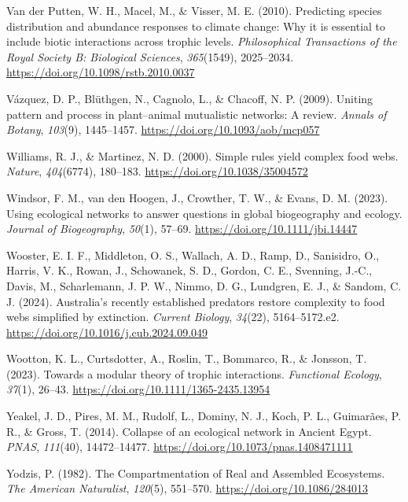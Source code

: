 \documentclass[
]{article}
\newlength{\cslhangindent}
\newenvironment{CSLReferences}[2] %
 {\begin{list}{}{%
  \setlength{\itemindent}{0pt}
  \setlength{\leftmargin}{0pt}
  \setlength{\parsep}{0pt}
  \ifodd #1
   \setlength{\leftmargin}{\cslhangindent}
   \setlength{\itemindent}{-1\cslhangindent}
  \fi
  \setlength{\itemsep}{#2\baselineskip}}}
 {\end{list}}
\begin{document}
\begin{CSLReferences}{1}{0}
Van der Putten, W. H., Macel, M., \& Visser, M. E. (2010). Predicting
species distribution and abundance responses to climate change: Why it
is essential to include biotic interactions across trophic levels.
\emph{Philosophical Transactions of the Royal Society B: Biological
Sciences}, \emph{365}(1549), 2025--2034.
\url{https://doi.org/10.1098/rstb.2010.0037}

Vázquez, D. P., Blüthgen, N., Cagnolo, L., \& Chacoff, N. P. (2009).
Uniting pattern and process in plant--animal mutualistic networks: A
review. \emph{Annals of Botany}, \emph{103}(9), 1445--1457.
\url{https://doi.org/10.1093/aob/mcp057}

Williams, R. J., \& Martinez, N. D. (2000). Simple rules yield complex
food webs. \emph{Nature}, \emph{404}(6774), 180--183.
\url{https://doi.org/10.1038/35004572}

Windsor, F. M., van den Hoogen, J., Crowther, T. W., \& Evans, D. M.
(2023). Using ecological networks to answer questions in global
biogeography and ecology. \emph{Journal of Biogeography}, \emph{50}(1),
57--69. \url{https://doi.org/10.1111/jbi.14447}

Wooster, E. I. F., Middleton, O. S., Wallach, A. D., Ramp, D.,
Sanisidro, O., Harris, V. K., Rowan, J., Schowanek, S. D., Gordon, C.
E., Svenning, J.-C., Davis, M., Scharlemann, J. P. W., Nimmo, D. G.,
Lundgren, E. J., \& Sandom, C. J. (2024). Australia's recently
established predators restore complexity to food webs simplified by
extinction. \emph{Current Biology}, \emph{34}(22), 5164--5172.e2.
\url{https://doi.org/10.1016/j.cub.2024.09.049}

Wootton, K. L., Curtsdotter, A., Roslin, T., Bommarco, R., \& Jonsson,
T. (2023). Towards a modular theory of trophic interactions.
\emph{Functional Ecology}, \emph{37}(1), 26--43.
\url{https://doi.org/10.1111/1365-2435.13954}

Yeakel, J. D., Pires, M. M., Rudolf, L., Dominy, N. J., Koch, P. L.,
Guimarães, P. R., \& Gross, T. (2014). Collapse of an ecological network
in {Ancient Egypt}. \emph{PNAS}, \emph{111}(40), 14472--14477.
\url{https://doi.org/10.1073/pnas.1408471111}

Yodzis, P. (1982). The {Compartmentation} of {Real} and {Assembled
Ecosystems}. \emph{The American Naturalist}, \emph{120}(5), 551--570.
\url{https://doi.org/10.1086/284013}

\end{CSLReferences}
\end{document}
